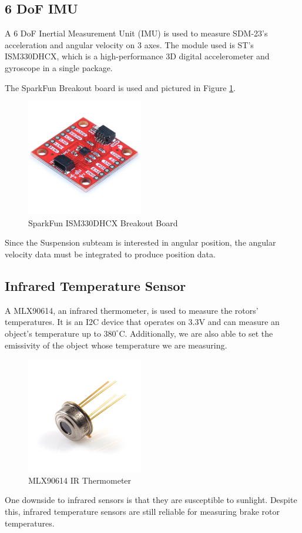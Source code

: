 \subsection{6 DoF IMU}
A 6 DoF Inertial Measurement Unit (IMU) is used to measure SDM-23's acceleration and angular velocity on 3 axes.
The module used is ST's ISM330DHCX, which is a high-performance 3D digital accelerometer and gyroscope in a single package.

The SparkFun Breakout board is used and pictured in Figure \ref{fig:ism330dhcx}.
\begin{figure}[H]
        \centering
        \includegraphics[width=2in]{images/6DoFIMU_03a.jpg}
        \caption{SparkFun ISM330DHCX Breakout Board}
        \label{fig:ism330dhcx}
\end{figure}
Since the Suspension subteam is interested in angular position, the angular velocity data must be integrated to produce position data.

\subsection{Infrared Temperature Sensor}
A MLX90614, an infrared thermometer, is used to measure the rotors' temperatures.
It is an I2C device that operates on 3.3V and can measure an object's temperature up to $380^\circ$C.
Additionally, we are also able to set the emissivity of the object whose temperature we are measuring.
\begin{figure}[H]
        \centering
        \includegraphics[width=2in]{images/mlx90614.jpg}
        \caption{MLX90614 IR Thermometer}
        \label{fig:mlx90614}
\end{figure}
One downside to infrared sensors is that they are susceptible to sunlight.
Despite this, infrared temperature sensors are still reliable for measuring brake rotor temperatures.


